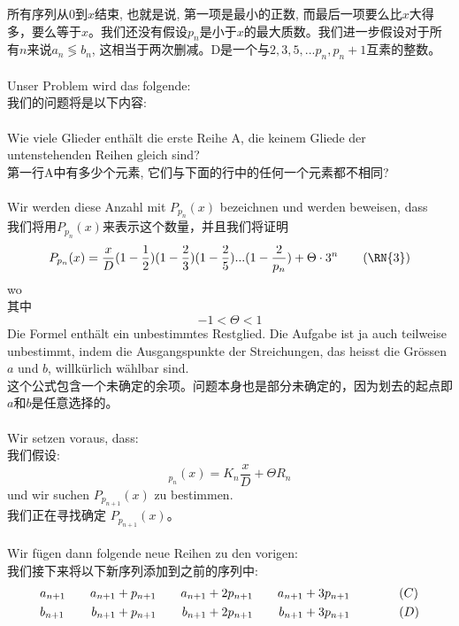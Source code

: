 \documentclass[UTF8,a4paper,zihao=-4]{article}
\begin{document}
\indent 所有序列从$0$到$x$结束, 也就是说, 第一项是最小的正数, 而最后一项要么比$x$大得多，要么等于$x$。我们还没有假设$p_n$是小于$x$的最大质数。我们进一步假设对于所有$n$来说$a_n\lessgtr b_n$, 这相当于两次删减。D是一个与$2,3,5,...p_n,p_n+1$互素的整数。\\\\
\indent Unser Problem wird das folgende:\\
\indent 我们的问题将是以下内容:\\\\
\indent Wie viele Glieder enthält die erste Reihe A, die keinem Gliede der untenstehenden Reihen gleich sind?\\
\indent 第一行A中有多少个元素, 它们与下面的行中的任何一个元素都不相同?\\\\
\indent Wir werden diese Anzahl mit $P_{p_n}(x)$ bezeichnen und werden beweisen, dass\\
\indent 我们将用$P_{p_n}(x)$来表示这个数量，并且我们将证明
\begin{align}
P_{p_n}(x)=\frac{x}{D}(1-\frac{1}{2})(1-\frac{2}{3})(1-\frac{2}{5})...(1-\frac{2}{p_n})+\Theta\cdot3^n\tag{\RN{3}}
\end{align}
wo\\
其中
$$-1<\Theta<1$$
\indent Die Formel enthält ein unbestimmtes Restglied. Die Aufgabe ist ja auch teilweise unbestimmt, indem die Ausgangspunkte der Streichungen, das heisst die Grössen $a$ und $b$, willkürlich wählbar sind.\\
\indent 这个公式包含一个未确定的余项。问题本身也是部分未确定的，因为划去的起点即$a$和$b$是任意选择的。\\\\
\indent Wir setzen voraus, dass:\\
\indent 我们假设:
$$
_{p_n}(x)=K_n\frac{x}{D}+\Theta R_n
$$
und wir suchen $P_{p_{n+1}}(x)$ zu bestimmen.\\
我们正在寻找确定 $P_{p_{n+1}}(x)$。\\\\
\indent Wir fügen dann folgende neue Reihen zu den vorigen:\\
\indent 我们接下来将以下新序列添加到之前的序列中:
\begin{align*}
    &a_{n+1}\hspace{2em}a_{n+1}+p_{n+1}\hspace{2em}a_{n+1}+2p_{n+1}\hspace{2em}a_{n+1}+3p_{n+1}\hspace{4em}(C)\\
    &b_{n+1}\hspace{2.2em}b_{n+1}+p_{n+1}\hspace{2.1em}b_{n+1}+2p_{n+1}\hspace{2.1em}b_{n+1}+3p_{n+1}\hspace{4em}(D)
\end{align*}
\end{document}
